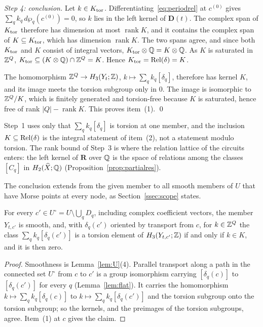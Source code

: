 \emph{Step 4: conclusion.} Let $k\in K_{\rm tor}$. Differentiating~\eqref{eq:periodrel} at $c^{(0)}$ gives
$\sum_qk_q\,d\wp_q(c^{(0)})=0$, so $k$ lies in the left kernel of $\mathbf D(t)$. The complex span of $K_{\rm tor}$ therefore has
dimension at most $\operatorname{rank}K$, and it contains the complex span of $K\subseteq K_{\rm tor}$, which has dimension
$\operatorname{rank}K$. The two spans agree, and since both $K_{\rm tor}$ and $K$ consist of integral vectors, $K_{\rm tor}\otimes\mathbb Q=K\otimes\mathbb Q$.
As $K$ is saturated in $\mathbb Z^Q$, $K_{\rm tor}\subseteq(K\otimes\mathbb Q)\cap\mathbb Z^Q=K$. Hence $K_{\rm tor}=\operatorname{Rel}(\delta)=K$.

The homomorphism $\mathbb Z^Q\to H_3(Y_t;\mathbb Z)$, $k\mapsto\sum_qk_q[\delta_q]$, therefore has kernel $K$, and its image meets the
torsion subgroup only in $0$. The image is isomorphic to $\mathbb Z^Q/K$, which is finitely generated and torsion-free because
$K$ is saturated, hence free of rank $|Q|-\operatorname{rank}K$. This proves item~(1). \qed

\begin{remark}\label{rem:relationsU}
Step~1 uses only that $\sum_qk_q[\delta_q]$ is torsion at one member, and the inclusion $K\subseteq\operatorname{Rel}(\delta)$ is the
integral statement of item~(2), not a statement modulo torsion. The rank bound of Step~3 is where the relation lattice
of the circuits enters: the left kernel of $\mathbf R$ over $\mathbb Q$ is the space of relations among the classes $[C_q]$ in
$H_2(\widehat X;\mathbb Q)$ (Proposition~\ref{prop:partialres}).
\end{remark}

The conclusion extends from the given member to all smooth members of $U$ that have Morse points at every node, as
Section~\ref{ssec:scope} states.

\begin{proposition}\label{prop:relationsU}
For every $c'\in U^\circ=U\setminus\bigcup_qD_q$, including complex coefficient vectors, the member $Y_{t,c'}$ is smooth, and,
with $\delta_q(c')$ oriented by transport from $c$, for $k\in\mathbb Z^Q$ the class $\sum_qk_q[\delta_q(c')]$ is a torsion element of $H_3(Y_{t,c'};\mathbb Z)$ if and only if $k\in K$, and
it is then zero.
\end{proposition}

\begin{proof}
Smoothness is Lemma~\ref{lem:U}(4). Parallel transport along a path in the connected set $U^\circ$ from $c$ to $c'$ is a
group isomorphism carrying $[\delta_q(c)]$ to $[\delta_q(c')]$ for every $q$ (Lemma~\ref{lem:flat}). It carries the
homomorphism $k\mapsto\sum_qk_q[\delta_q(c)]$ to $k\mapsto\sum_qk_q[\delta_q(c')]$ and the torsion subgroup onto the torsion
subgroup; so the kernels, and the preimages of the torsion subgroups, agree. Item~(1) at $c$ gives the claim.
\end{proof}

